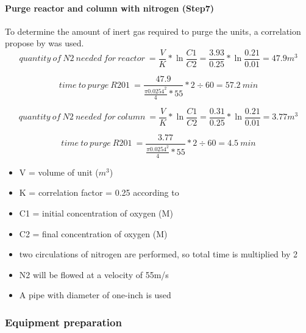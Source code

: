 \paragraph{Purge reactor and column with nitrogen (Step7)}
 To determine the amount of inert gas required to purge the units, a correlation propose by \textcite{kinsley_properly_2001} was used.
 \begin{equation}
        quantity\:of\:N2\:needed\:for\:reactor\:=\frac{V}{K} * \ln \frac{C1}{C2} = \frac{3.93}{0.25} * \ln \frac{0.21}{0.01} = 47.9 m^3
    \end{equation}
    
    \begin{equation}
        time\:to\:purge\:R201\:=\frac{47.9}{\frac{\pi 0.0254^2}{4} * 55} * 2 \div 60 = 57.2\:min
    \end{equation}
    
    \begin{equation}
        quantity\:of\:N2\:needed\:for\:column\:=\frac{V}{K} * \ln \frac{C1}{C2} = \frac{0.31}{0.25} * \ln \frac{0.21}{0.01} = 3.77 m^3
    \end{equation}
    
    \begin{equation}
        time\:to\:purge\:R201\:=\frac{3.77}{\frac{\pi 0.0254^2}{4} * 55} * 2 \div 60 = 4.5\:min
    \end{equation}
    
    \begin{itemize}
        \item V = volume of unit ($m^3$)
        \item K = correlation factor = 0.25 according to \textcite{}
        \item C1 = initial concentration of oxygen (M)
        \item C2 = final concentration of oxygen (M)
        \item two circulations of nitrogen are performed, so total time is multiplied by 2
        \item N2 will be flowed at a velocity of 55m/s
        \item A pipe with diameter of one-inch is used
    \end{itemize}
    
\subsubsection{Equipment preparation}

